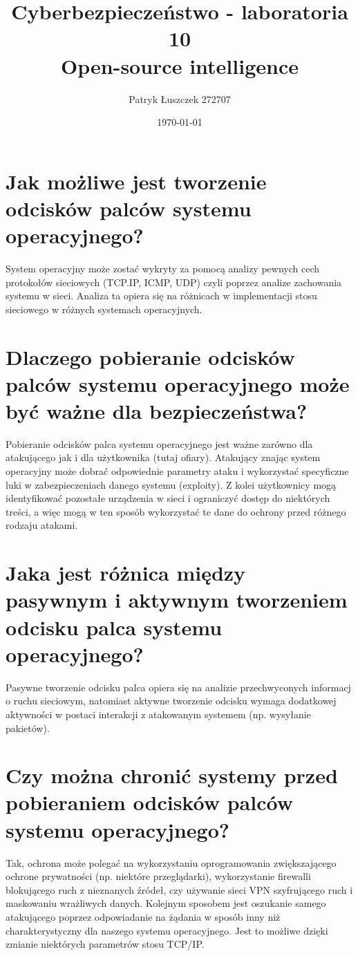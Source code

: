 \documentclass{article}
\title{%
  Cyberbezpieczeństwo - laboratoria 10 \\
  \large Open-source intelligence}
\author{Patryk Łuszczek 272707}
\date{\today}
\begin{document}
\maketitle
\newpage


\section*{Jak możliwe jest tworzenie odcisków palców systemu operacyjnego?}
System operacyjny może zostać wykryty za pomocą analizy pewnych cech protokołów sieciowych (TCP.IP, ICMP, UDP) czyli poprzez analize
zachowania systemu w sieci. Analiza ta opiera się na różnicach w implementacji stosu sieciowego w różnych systemach operacyjnych.
\section*{Dlaczego pobieranie odcisków palców systemu operacyjnego może być ważne dla
  bezpieczeństwa?}
Pobieranie odcisków palca systemu operacyjnego jest ważne zarówno dla atakującego jak i dla użytkownika (tutaj ofiary). Atakujący znając system operacyjny może dobrać odpowiednie
parametry ataku i wykorzystać specyficzne luki w zabezpieczeniach danego systemu (exploity). Z kolei użytkownicy mogą identyfikować pozostałe urządzenia w sieci i ograniczyć dostęp do niektórych treści, a więc mogą w ten sposób
wykorzystać te dane do ochrony przed różnego rodzaju atakami.
\section*{Jaka jest różnica między pasywnym i aktywnym tworzeniem odcisku palca systemu
  operacyjnego?}
Pasywne tworzenie odcisku palca opiera się na analizie przechwyconych informacj o ruchu sieciowym, natomiast aktywne tworzenie odcisku wymaga dodatkowej aktywności
w postaci interakcji z atakowanym systemem (np. wysyłanie pakietów).
\section*{Czy można chronić systemy przed pobieraniem odcisków palców systemu
  operacyjnego?}
Tak, ochrona może polegać na wykorzystaniu oprogramowania zwiększającego ochrone prywatności (np. niektóre przeglądarki), wykorzystanie firewalli blokującego ruch
z nieznanych źródeł, czy używanie sieci VPN szyfrującego ruch i maskowaniu wrażliwych danych. Kolejnym sposobem jest oszukanie samego atakującego poprzez odpowiadanie na żądania w sposób inny niż charakterystyczny
dla naszego systemu operacyjnego. Jest to możliwe dzięki zmianie niektórych parametrów stosu TCP/IP.
\end{document}
